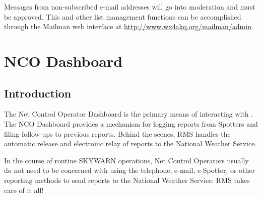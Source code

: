 \documentclass[pdflatex,letterpaper,twoside,12pt]{book}
\begin{document}
Messages from non-subscribed e-mail addresses will go into moderation and must be approved.  This and other list management functions can be accomplished through the Mailman web interface at \href{http://www.wx4akq.org/mailman/admin}{http://www.wx4akq.org/mailman/admin}.



\chapter{NCO Dashboard}\label{nco-dashboard}

\section{Introduction}

The Net Control Operator Dashboard is the primary means of interacting with .  The NCO Dashboard provides a mechanism for logging reports from Spotters and filing follow-ups to previous reports.  Behind the scenes, RMS handles the automatic release and electronic relay of reports to the National Weather Service.

In the course of routine SKYWARN operations, Net Control Operators usually do not need to be concerned with using the telephone, e-mail, e-Spotter, or other reporting methods to send reports to the National Weather Service.  RMS takes care of it all!

\end{document}
